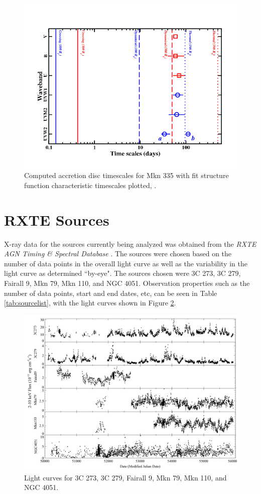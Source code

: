 \documentclass[12pt, oneside]{smuthesis}
\begin{document}
\begin{figure}[H]
	\centering
	\includegraphics[width=0.8\linewidth]{mkn335timescales}
	\caption{Computed accretion disc timescales for Mkn 335 with fit structure function characteristic timescales plotted, \cite{galloblue}.}
	\label{fig:accretiontimescales}
\end{figure}

\section{\sc RXTE Sources} \label{rxte}

X-ray data for the sources currently being analyzed was obtained from the \textit{RXTE AGN Timing \& Spectral Database} \citep{rxtepaper}. The sources were chosen based on the number of data points in the overall light curve as well as the variability in the light curve as determined ``by-eye". The sources chosen were 3C 273, 3C 279, Fairall 9, Mkn 79, Mkn 110, and NGC 4051. Observation properties such as the number of data points, start and end dates, etc, can be seen in Table \ref{tab:sourcelist}, with the light curves shown in Figure \ref{fig:rxtelc}.

\begin{figure}[H]
	\centering
	\includegraphics[width=\linewidth]{combinedlightcurves}
	\caption{Light curves for 3C 273, 3C 279, Fairall 9, Mkn 79, Mkn 110, and NGC 4051.}
	\label{fig:rxtelc}
\end{figure}
\end{document}
